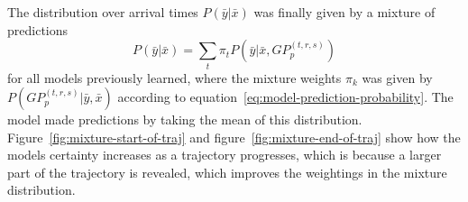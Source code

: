 \noindent
The distribution over arrival times $P(\bar{y} | \bar{x})$ was finally given by a mixture of predictions
\begin{equation}
  \label{eq:model-mixture}
  P(\bar{y} | \bar{x}) = \sum_{t}{\pi_{t}P(\bar{y}|\bar{x}, GP_p^{(t, r,s)})}
\end{equation}
for all models previously learned, where the mixture weights $\pi_k$ was given by $P(GP_p^{(t, r,s)} | \bar{y}, \bar{x})$ according to equation~\ref{eq:model-prediction-probability}. The model made predictions by taking the mean of this distribution. Figure~\ref{fig:mixture-start-of-traj} and figure~\ref{fig:mixture-end-of-traj} show how the models certainty increases as a trajectory progresses, which is because  a larger part of the trajectory is revealed, which improves the weightings in the mixture distribution.


